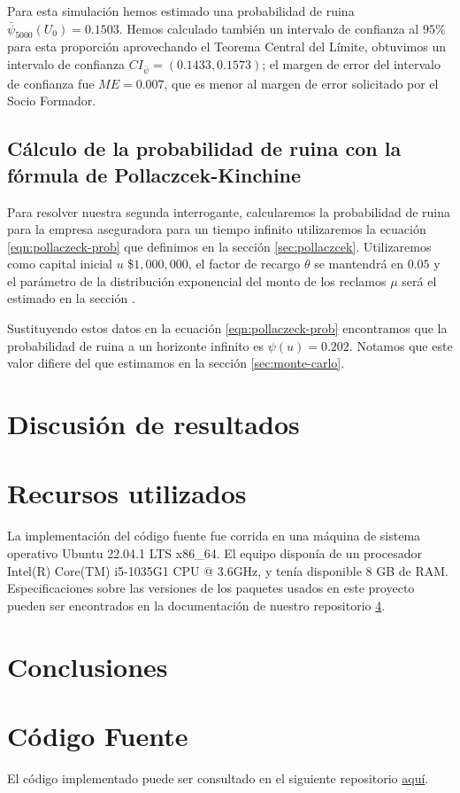 \documentclass[journal]{IEEEtran}
\begin{document}
            Para esta simulación hemos estimado una probabilidad de ruina $\bar{\psi}_{5000}(U_0) = 0.1503$. Hemos calculado también un intervalo de confianza al $95\%$ para esta proporción aprovechando el Teorema Central del Límite, obtuvimos un intervalo de confianza ${CI}_{\bar{\psi}} = \left(0.1433, 0.1573\right)$; el margen de error del intervalo de confianza fue $ME = 0.007$, que es menor al margen de error solicitado por el Socio Formador.

        \subsection{Cálculo de la probabilidad de ruina con la fórmula de Pollaczcek-Kinchine}

            Para resolver nuestra segunda interrogante, calcularemos la probabilidad de ruina para la empresa aseguradora para un tiempo infinito utilizaremos la ecuación \ref{eqn:pollaczeck-prob} que definimos en la sección \ref{sec:pollaczcek}. Utilizaremos como capital inicial $u$ \$$1,000,000$, el factor de recargo $\theta$ se mantendrá en $0.05$ y el parámetro de la distribución exponencial del monto de los reclamos $\mu$ será el estimado en la sección .
            
            Sustituyendo estos datos en la ecuación \ref{eqn:pollaczeck-prob} encontramos que la probabilidad de ruina a un horizonte infinito es $\psi(u) = 0.202$. Notamos que este valor difiere del que estimamos en la sección \ref{sec:monte-carlo}.

    \section{Discusión de resultados}

    \section{Recursos utilizados}

        La implementación del código fuente fue corrida en una máquina de sistema operativo Ubuntu 22.04.1 LTS x86\_64. El equipo disponía de un procesador Intel(R) Core(TM) i5-1035G1 CPU @ 3.6GHz, y tenía disponible 8 GB de RAM. Especificaciones sobre las versiones de los paquetes usados en este proyecto pueden ser encontrados en la documentación de nuestro repositorio \ref{sec:source-code}.
        
    \section{Conclusiones}
    
    \appendices

    \section{Código Fuente} \label{sec:source-code}

        El código implementado puede ser consultado en el siguiente repositorio \href{https://github.com/JuanEcheagaray75/ruin-model}{aquí}.
    \nocite{*}
    
    
    
\end{document}
